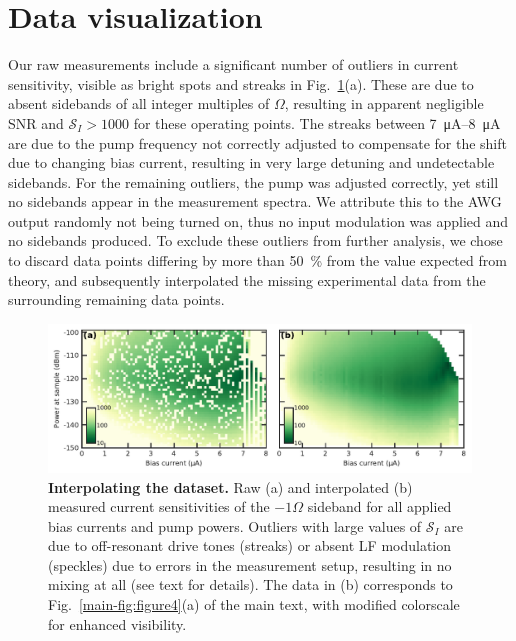 \section{Data visualization}

Our raw measurements include a significant number of outliers in current sensitivity, visible as bright spots and streaks in Fig.~\ref{fig:fig4aclipnointerp}(a).
% 
These are due to absent sidebands of all integer multiples of $\Omega$, resulting in apparent negligible SNR and $\mathcal{S}_I > 1000$ for these operating points.
% 
The streaks between \SIrange{7}{8}{\micro\ampere} are due to the pump frequency not correctly adjusted to compensate for the shift due to changing bias current, resulting in very large detuning and undetectable sidebands.
% 
For the remaining outliers, the pump was adjusted correctly, yet still no sidebands appear in the measurement spectra.
%
We attribute this to the AWG output randomly not being turned on, thus no input modulation was applied and no sidebands produced.
% 
To exclude these outliers from further analysis, we chose to discard data points differing by more than \SI{50}{\percent} from the value expected from theory, and subsequently interpolated the missing experimental data from the surrounding remaining data points.

\begin{figure}
	\centering
	\includegraphics[width=\linewidth]{chapter-currentdetection/figures/SM_interpolation}
	\caption{
		\textbf{Interpolating the dataset.}
		Raw (a) and interpolated (b) measured current sensitivities of the $-1\Omega$ sideband for all applied bias currents and pump powers.
		Outliers with large values of $\mathcal{S}_I$ are due to off-resonant drive tones (streaks) or absent LF modulation (speckles) due to errors in the measurement setup, resulting in no mixing at all (see text for details).
		The data in (b) corresponds to Fig.~\ref{main-fig:figure4}(a) of the main text, with modified colorscale for enhanced visibility.
	}
	\label{fig:fig4aclipnointerp}
\end{figure}

